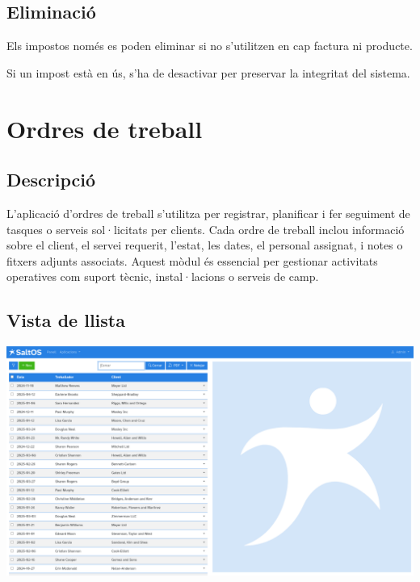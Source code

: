 \documentclass[a4paper]{article}
\begin{document}
\hypertarget{toc170}{}
\subsection{Eliminació}

Els impostos només es poden eliminar si no s'utilitzen en cap factura ni producte.

Si un impost està en ús, s'ha de desactivar per preservar la integritat del sistema.


\hypertarget{toc171}{}
\section{Ordres de treball}

\hypertarget{toc172}{}
\subsection{Descripció}

L'aplicació d'ordres de treball s'utilitza per registrar, planificar i fer seguiment de tasques o serveis sol·licitats per clients.
Cada ordre de treball inclou informació sobre el client, el servei requerit, l'estat, les dates, el personal assignat,
i notes o fitxers adjunts associats. Aquest mòdul és essencial per gestionar activitats operatives com suport tècnic, instal·lacions o serveis de camp.

\hypertarget{toc173}{}
\subsection{Vista de llista}

\begin{center}\includegraphics[width=1\textwidth]{../ujest/snaps/test-screenshots-js-screenshots-sales-workorders-list-ca-es-1-snap.png}\end{center}
\end{document}

